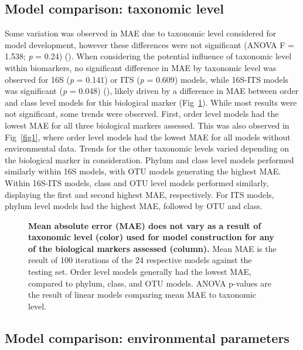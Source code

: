 \documentclass[
  10pt,
  letterpaper,
]{article}
\begin{document}
\subsection{Model comparison: taxonomic
level}\label{model-comparison-taxonomic-level}

Some variation was observed in MAE due to taxonomic level considered for
model development, however these differences were not significant (ANOVA
F = 1.538; \emph{p} = 0.24) (). When considering the
potential influence of taxonomic level within biomarkers, no significant
difference in MAE by taxonomic level was observed for 16S (\emph{p} =
0.141) or ITS (\emph{p} = 0.609) models, while 16S-ITS models was
significant (\emph{p} = 0.048) (), likely driven by a
difference in MAE between order and class level models for this
biological marker (Fig~\ref{fig4}). While most results were not
significant, some trends were observed. First, order level models had
the lowest MAE for all three biological markers assessed. This was also
observed in Fig~\ref{fig1}, where order level models had the lowest MAE
for all models without environmental data. Trends for the other
taxonomic levels varied depending on the biological marker in
consideration. Phylum and class level models performed similarly within
16S models, with OTU models generating the highest MAE. Within 16S-ITS
models, class and OTU level models performed similarly, displaying the
first and second highest MAE, respectively. For ITS models, phylum level
models had the highest MAE, followed by OTU and class.

\begin{figure}[!h]
\caption{{\bf Mean absolute error (MAE) does not vary as a result of taxonomic level (color) used for model construction for any of the biological markers assessed (column).}
Mean MAE is the result of 100 iterations of the 24 respective models against the testing set. Order level models generally had the lowest MAE, compared to phylum, class, and OTU models. ANOVA p-values are the result of linear models comparing mean MAE to taxonomic level.}
\label{fig4}
\end{figure}

\subsection{Model comparison: environmental
parameters}\label{model-comparison-environmental-parameters}
\end{document}
